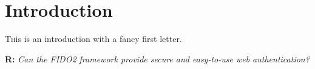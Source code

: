 
\section{Introduction}
\label{sec:intro}

\lettrine[nindent=0em,lines=3]{T}his is an introduction with a fancy first letter. \blindtext

\begin{displayquote}
    \textbf{R:} \emph{Can the FIDO2 framework provide secure and easy-to-use web authentication?}
\end{displayquote}

\blindtext
